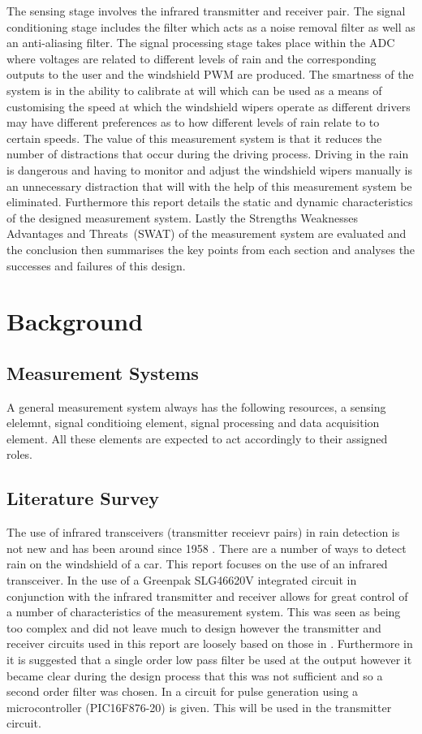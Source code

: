 \documentclass[conference, 11pt]{IEEEtran}
\begin{document}
The sensing stage involves the infrared transmitter and receiver pair. The signal conditioning stage includes the filter which acts as a noise removal filter as well as an anti-aliasing filter. The signal processing stage takes place within the ADC where voltages are related to different levels of rain and the corresponding outputs to the user and the windshield PWM are produced. The smartness of the system is in the ability to calibrate at will which can be used as a means of customising the speed at which the windshield wipers operate as different drivers may have different preferences as to how different levels of rain relate to to certain speeds. The value of this measurement system is that it reduces the number of distractions that occur during the driving process. Driving in the rain is dangerous and having to monitor and adjust the windshield wipers manually is an unnecessary distraction that will with the help of this measurement system be eliminated. Furthermore this report details the static and dynamic characteristics of the designed measurement system. Lastly the Strengths Weaknesses Advantages and Threats~(SWAT) of the measurement system are evaluated and the conclusion then summarises the key points from each section and analyses the successes and failures of this design. 

\section{Background}
	
	
	
\subsection{Measurement Systems}
A general measurement system always has the following  resources, a sensing elelemnt, signal conditioing element, signal processing and data acquisition element. All these elements are expected to act accordingly to their assigned roles. 

	
\subsection{Literature Survey}
The use of infrared transceivers (transmitter receievr pairs) in rain detection is not new and has been around since 1958 \cite{SENS}. There are a number of ways to detect rain on the windshield of a car. This report focuses on the use of an infrared transceiver. In \cite{NOTE} the use of a Greenpak SLG46620V integrated circuit in conjunction with the infrared transmitter and receiver allows for great control of a number of characteristics of the measurement system. This was seen as being too complex and did not leave much to design however the transmitter and receiver circuits used in this report are loosely based on those in \cite{NOTE}. 
Furthermore in \cite{NOTE} it is suggested that a single order low pass filter be used at the output however it became clear during the design process that this was not sufficient and so a second order filter was chosen. In
\cite{PULSE} a circuit for pulse generation using a microcontroller (PIC16F876-20) is given. This will be used in the transmitter circuit. 
\end{document}

